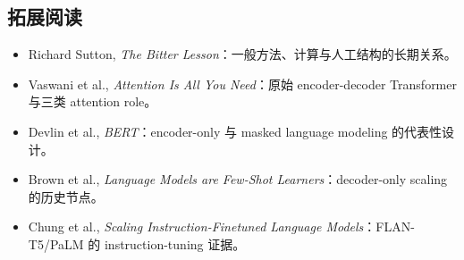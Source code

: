 \documentclass[a4paper]{article}
\begin{document}
\subsection{拓展阅读}

\begin{itemize}
  \item Richard Sutton, \emph{The Bitter Lesson}：一般方法、计算与人工结构的长期关系。
  \item Vaswani et al., \emph{Attention Is All You Need}：原始 encoder-decoder Transformer 与三类 attention role。
  \item Devlin et al., \emph{BERT}：encoder-only 与 masked language modeling 的代表性设计。
  \item Brown et al., \emph{Language Models are Few-Shot Learners}：decoder-only scaling 的历史节点。
  \item Chung et al., \emph{Scaling Instruction-Finetuned Language Models}：FLAN-T5/PaLM 的 instruction-tuning 证据。
\end{itemize}
\end{document}

